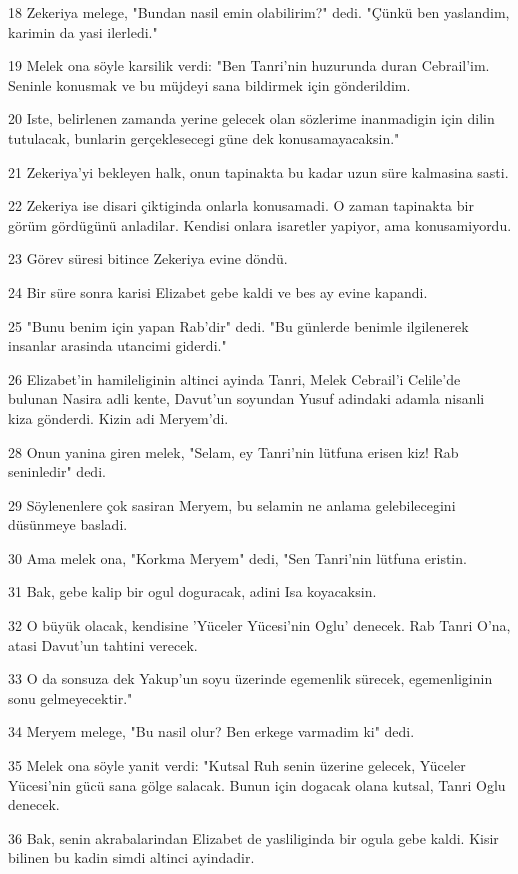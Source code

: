 \par 18 Zekeriya melege, "Bundan nasil emin olabilirim?" dedi. "Çünkü ben yaslandim, karimin da yasi ilerledi."
\par 19 Melek ona söyle karsilik verdi: "Ben Tanri'nin huzurunda duran Cebrail'im. Seninle konusmak ve bu müjdeyi sana bildirmek için gönderildim.
\par 20 Iste, belirlenen zamanda yerine gelecek olan sözlerime inanmadigin için dilin tutulacak, bunlarin gerçeklesecegi güne dek konusamayacaksin."
\par 21 Zekeriya'yi bekleyen halk, onun tapinakta bu kadar uzun süre kalmasina sasti.
\par 22 Zekeriya ise disari çiktiginda onlarla konusamadi. O zaman tapinakta bir görüm gördügünü anladilar. Kendisi onlara isaretler yapiyor, ama konusamiyordu.
\par 23 Görev süresi bitince Zekeriya evine döndü.
\par 24 Bir süre sonra karisi Elizabet gebe kaldi ve bes ay evine kapandi.
\par 25 "Bunu benim için yapan Rab'dir" dedi. "Bu günlerde benimle ilgilenerek insanlar arasinda utancimi giderdi."
\par 26 Elizabet'in hamileliginin altinci ayinda Tanri, Melek Cebrail'i Celile'de bulunan Nasira adli kente, Davut'un soyundan Yusuf adindaki adamla nisanli kiza gönderdi. Kizin adi Meryem'di.
\par 28 Onun yanina giren melek, "Selam, ey Tanri'nin lütfuna erisen kiz! Rab seninledir" dedi.
\par 29 Söylenenlere çok sasiran Meryem, bu selamin ne anlama gelebilecegini düsünmeye basladi.
\par 30 Ama melek ona, "Korkma Meryem" dedi, "Sen Tanri'nin lütfuna eristin.
\par 31 Bak, gebe kalip bir ogul doguracak, adini Isa koyacaksin.
\par 32 O büyük olacak, kendisine 'Yüceler Yücesi'nin Oglu' denecek. Rab Tanri O'na, atasi Davut'un tahtini verecek.
\par 33 O da sonsuza dek Yakup'un soyu üzerinde egemenlik sürecek, egemenliginin sonu gelmeyecektir."
\par 34 Meryem melege, "Bu nasil olur? Ben erkege varmadim ki" dedi.
\par 35 Melek ona söyle yanit verdi: "Kutsal Ruh senin üzerine gelecek, Yüceler Yücesi'nin gücü sana gölge salacak. Bunun için dogacak olana kutsal, Tanri Oglu denecek.
\par 36 Bak, senin akrabalarindan Elizabet de yasliliginda bir ogula gebe kaldi. Kisir bilinen bu kadin simdi altinci ayindadir.
